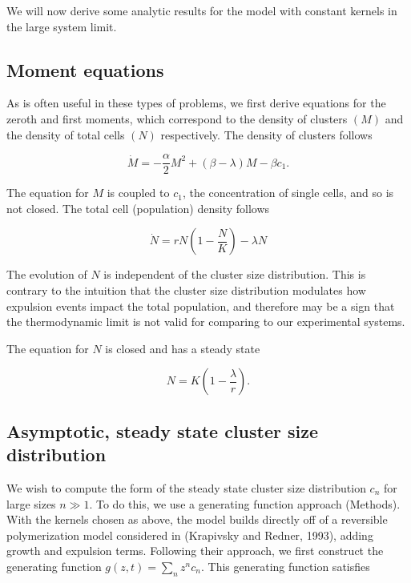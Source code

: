 \documentclass[12pt]{article}
\def\be{\begin{equation}}
\def\ee{\end{equation}}
\begin{document}
We will now derive some analytic results for the model with constant kernels in the large system limit. 
 
\subsection*{Moment equations}
As is often useful in these types of problems, we first derive equations for the zeroth and first moments, which correspond to the density of clusters $(M)$ and the density of total cells $(N)$ respectively. The density of clusters follows



\be
\dot{M} = -\frac{\alpha}{2}M^2 +(\beta-\lambda)M - \beta c_1.
\ee

\noindent The equation for $M$ is coupled to $c_1$, the concentration of single cells, and so is not closed. The total cell (population) density follows %




\be
\dot{N} = rN\left(1-\frac{N}{K}\right) - \lambda N
\ee


The evolution of $N$ is independent of the cluster size distribution. This is contrary to the intuition that the cluster size distribution modulates how expulsion events impact the total population, and therefore may be a sign that the thermodynamic limit is not valid for comparing to our experimental systems.

The equation for $N$ is closed and has a steady state

\be
N = K\left(1-\frac{\lambda}{r}\right).
\ee

\subsection*{Asymptotic, steady state cluster size distribution}

We wish to compute the form of the steady state cluster size distribution $c_n$ for large sizes $n\gg 1$. To do this, we use a generating function approach (Methods). With the kernels chosen as above, the model builds directly off of a reversible polymerization model considered in (Krapivsky and Redner, 1993), adding growth and expulsion terms. Following their approach, we first construct the generating function $g(z,t) = \sum_n z^nc_n$. This generating function satisfies
\end{document}
